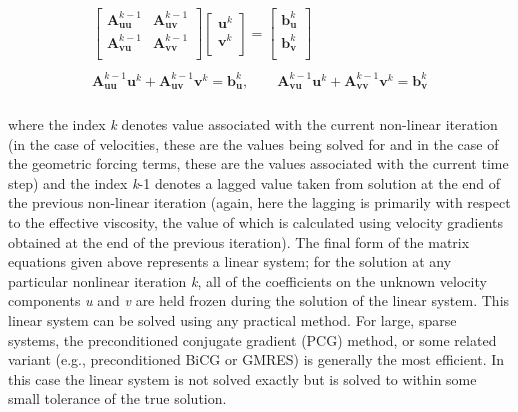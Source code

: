 \begin{align*}
\begin{matrix}
  \left[ \begin{matrix}
   \mathbf{A}_{\mathbf{uu}}^{k-1} & \mathbf{A}_{\mathbf{uv}}^{k-1}  \\
   \mathbf{A}_{\mathbf{vu}}^{k-1} & \mathbf{A}_{\mathbf{vv}}^{k-1}  \\
\end{matrix} \right]\left[ \begin{matrix}
   \mathbf{u}^{k}  \\
   \mathbf{v}^{k}  \\
\end{matrix} \right]=\left[ \begin{matrix}
   \mathbf{b}_{\mathbf{u}}^{k}  \\
   \mathbf{b}_{\mathbf{v}}^{k}  \\
\end{matrix} \right] \\ 
   \\ 
  \mathbf{A}_{\mathbf{uu}}^{k-1}\mathbf{u}^{k} + \mathbf{A}_{\mathbf{uv}}^{k-1}\mathbf{v}^{k} =\mathbf{b}_{\mathbf{u}}^{k},
  \quad \quad \mathbf{A}_{\mathbf{vu}}^{k-1}\mathbf{u}^{k} + \mathbf{A}_{\mathbf{vv}}^{k-1}\mathbf{v}^{k} =\mathbf{b}_{\mathbf{v}}^{k} \\ 
\end{matrix}
\end{align*}

where the index \textit{k} denotes value associated with the current non-linear iteration (in the case of velocities, these are the values being solved for and in the case of the geometric forcing terms, these are the values associated with the current time step) and the index \textit{k}-1 denotes a lagged value taken from solution at the end of the previous non-linear iteration (again, here the lagging is primarily with respect to the effective viscosity, the value of which is calculated using velocity gradients obtained at the end of the previous iteration). The final form of the matrix equations given above represents a linear system; for the solution at any particular nonlinear iteration \textit{k}, all of the coefficients on the unknown velocity components \textit{u} and \textit{v} are held frozen during the solution of the linear system. This linear system can be solved using any practical method. For large, sparse systems, the preconditioned conjugate gradient (PCG) method, or some related variant (e.g., preconditioned BiCG or GMRES) is generally the most efficient. In this case the linear system is not solved exactly but is solved to within some small tolerance of the true solution.

